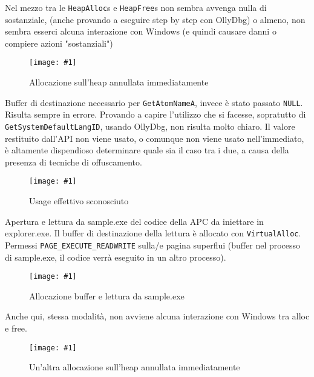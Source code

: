 \documentclass[
    a4paper, %
    11pt %
]{article}
\newcommand{\pic}[4]{\begin{figure}[H]
            \centering
            \texttt{[image: \#1]}
            \caption{#2}
            \label{fig:#1}
            \end{figure}}
\begin{document}
            Nel mezzo tra le \texttt{HeapAlloc}s e \texttt{HeapFree}s non sembra avvenga nulla di sostanziale,
            (anche provando a eseguire step by step con OllyDbg)
            o almeno, non sembra esserci alcuna interazione con Windows (e quindi causare danni o compiere azioni
            "sostanziali")
            \pic{malcode1_firstcalls}{Allocazione sull'heap annullata immediatamente}{10cm}{3.5cm}
            Buffer di destinazione necessario per \texttt{GetAtomNameA}, invece è stato passato \texttt{NULL}.
            Risulta sempre in errore. Provando a capire l'utilizzo che si facesse, sopratutto di \texttt{GetSystemDefaultLangID}, usando OllyDbg, non risulta molto chiaro. Il valore restituito
            dall'API non viene usato, o comunque non viene usato nell'immediato, è altamente dispendioso determinare
            quale sia il caso tra i due, a causa della presenza di tecniche di offuscamento.
            \pic{malcode1_secondcalls}{Usage effettivo sconosciuto}{12cm}{1.5cm}
            
            Apertura e lettura da sample.exe del codice della APC da iniettare in explorer.exe. Il buffer di 
            destinazione della
            lettura è allocato con \texttt{VirtualAlloc}. Permessi \texttt{PAGE\_EXECUTE\_READWRITE} 
            sulla/e pagina superflui (buffer nel processo di sample.exe, il codice verrà eseguito in un altro processo).
            \pic{malcode1_thirdcalls}{Allocazione buffer e lettura da sample.exe}{10cm}{3cm}

            Anche qui, stessa modalità, non avviene alcuna interazione con Windows tra alloc e free.
            \pic{malcode1_fourthcalls}{Un'altra allocazione sull'heap annullata immediatamente}{10cm}{3.5cm}

            \pagebreak
\end{document}
